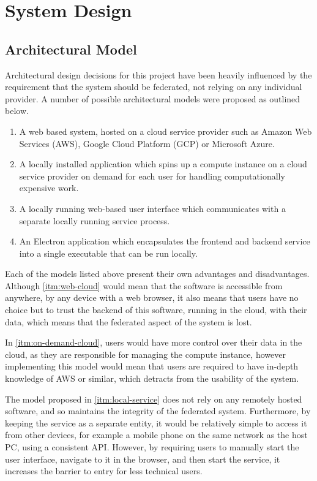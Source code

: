 \chapter{System Design}

\section{Architectural Model}
Architectural design decisions for this project have been heavily influenced by the requirement that the system should be federated, not relying on any individual provider. A number of possible architectural models were proposed as outlined below.

\begin{enumerate}
  \item \label{itm:web-cloud} A web based system, hosted on a cloud service provider such as Amazon Web Services (AWS), Google Cloud Platform (GCP) or Microsoft Azure.
  \item \label{itm:on-demand-cloud} A locally installed application which spins up a compute instance on a cloud service provider on demand for each user for handling computationally expensive work.
  \item \label{itm:local-service} A locally running web-based user interface which communicates with a separate locally running service process.
  \item \label{itm:electron} An Electron application which encapsulates the frontend and backend service into a single executable that can be run locally.
\end{enumerate}

Each of the models listed above present their own advantages and disadvantages. Although \ref{itm:web-cloud} would mean that the software is accessible from anywhere, by any device with a web browser, it also means that users have no choice but to trust the backend of this software, running in the cloud, with their data, which means that the federated aspect of the system is lost.

In \ref{itm:on-demand-cloud}, users would have more control over their data in the cloud, as they are responsible for managing the compute instance, however implementing this model would mean that users are required to have in-depth knowledge of AWS or similar, which detracts from the usability of the system.

The model proposed in \ref{itm:local-service} does not rely on any remotely hosted software, and so maintains the integrity of the federated system. Furthermore, by keeping the service as a separate entity, it would be relatively simple to access it from other devices, for example a mobile phone on the same network as the host PC, using a consistent API. However, by requiring users to manually start the user interface, navigate to it in the browser, and then start the service, it increases the barrier to entry for less technical users.


